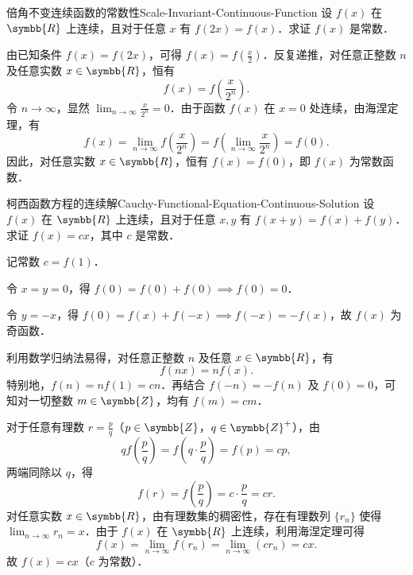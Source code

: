 \begin{problem}{倍角不变连续函数的常数性}{Scale-Invariant-Continuous-Function}
    设 $f(x)$ 在 $\symbb{R}$ 上连续，且对于任意 $x$ 有 $f(2x) = f(x)$．求证 $f(x)$ 是常数．
\end{problem}

\begin{myproof}
    由已知条件 $f(x) = f(2x)$，可得 $f(x) = f\left(\frac{x}{2}\right)$．反复递推，对任意正整数 $n$ 及任意实数 $x \in \symbb{R}$，恒有
    \begin{equation}
        f(x) = f\left( \frac{x}{2^n} \right).
    \end{equation}
    令 $n \to \infty$，显然 $\lim_{n\to\infty} \frac{x}{2^n} = 0$．由于函数 $f(x)$ 在 $x = 0$ 处连续，由海涅定理，有
    \begin{equation}
        f(x) = \lim_{n\to\infty} f\left( \frac{x}{2^n} \right) = f\left( \lim_{n\to\infty} \frac{x}{2^n} \right) = f(0).
    \end{equation}
    因此，对任意实数 $x \in \symbb{R}$，恒有 $f(x) = f(0)$，即 $f(x)$ 为常数函数．
\end{myproof}

\begin{problem}{柯西函数方程的连续解}{Cauchy-Functional-Equation-Continuous-Solution}
    设 $f(x)$ 在 $\symbb{R}$ 上连续，且对于任意 $x, y$ 有 $f(x+y) = f(x) + f(y)$．求证 $f(x) = cx$，其中 $c$ 是常数．
\end{problem}

\begin{myproof}
    记常数 $c = f(1)$．

    令 $x = y = 0$，得 $f(0) = f(0) + f(0) \implies f(0) = 0$．

    令 $y = -x$，得 $f(0) = f(x) + f(-x) \implies f(-x) = -f(x)$，故 $f(x)$ 为奇函数．

    利用数学归纳法易得，对任意正整数 $n$ 及任意 $x \in \symbb{R}$，有
    \begin{equation}
        f(nx) = n f(x).
    \end{equation}
    特别地，$f(n) = n f(1) = cn$．再结合 $f(-n) = -f(n)$ 及 $f(0) = 0$，可知对一切整数 $m \in \symbb{Z}$，均有 $f(m) = cm$．

    对于任意有理数 $r = \frac{p}{q}$（$p \in \symbb{Z}$，$q \in \symbb{Z}^+$），由
    \begin{equation}
        q f\left( \frac{p}{q} \right) = f\left( q \cdot \frac{p}{q} \right) = f(p) = cp,
    \end{equation}
    两端同除以 $q$，得
    \begin{equation}
        f(r) = f\left( \frac{p}{q} \right) = c \cdot \frac{p}{q} = cr.
    \end{equation}
    对任意实数 $x \in \symbb{R}$，由有理数集的稠密性，存在有理数列 $\{r_n\}$ 使得 $\lim_{n\to\infty} r_n = x$．由于 $f(x)$ 在 $\symbb{R}$ 上连续，利用海涅定理可得
    \begin{equation}
        f(x) = \lim_{n\to\infty} f(r_n) = \lim_{n\to\infty} (c r_n) = cx.
    \end{equation}
    故 $f(x) = cx$（$c$ 为常数）．
\end{myproof}

